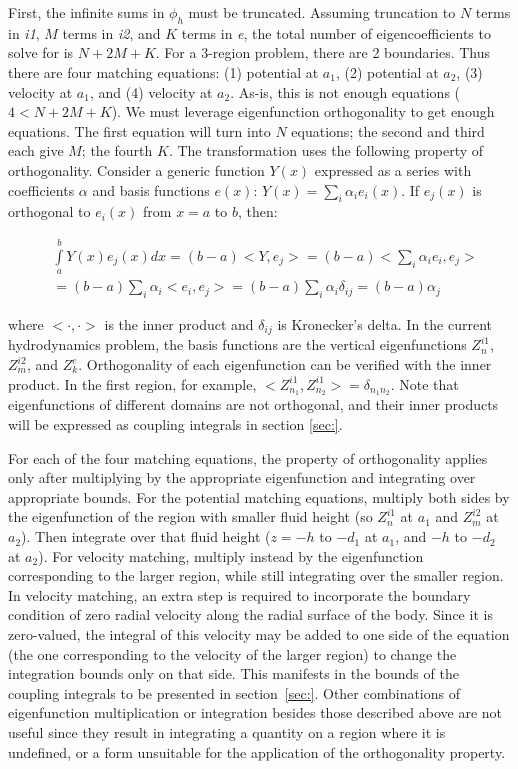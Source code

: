 \begin{appendices}
First, the infinite sums in $\phi_h$ must be truncated. Assuming truncation to $N$ terms in \textit{i1}, $M$ terms in \textit{i2}, and $K$ terms in \textit{e}, the total number of eigencoefficients to solve for is $N+2M+K$. For a 3-region problem, there are 2 boundaries. Thus there are four matching equations: (1) potential at $a_1$, (2) potential at $a_2$, (3) velocity at $a_1$, and (4) velocity at $a_2$. As-is, this is not enough equations ($4 < N+2M+K$). We must leverage eigenfunction orthogonality to get enough equations. The first equation will turn into $N$ equations; the second and third each give $M$; the fourth $K$. The transformation uses the following property of orthogonality. Consider a generic function $Y(x)$ expressed as a series with coefficients $\alpha$ and basis functions $e(x)$: $Y(x)=\sum_i \alpha_i e_i(x)$. If $e_j(x)$ is orthogonal to $e_i(x)$ from $x = a$ to $b$, then:

\begin{equation}
\begin{aligned}
       & \int\limits_a^b Y(x)e_j(x)dx = (b-a) <Y,e_j>=(b-a)<\sum_i \alpha_i e_i, e_j> \\ &= (b-a) \sum_i \alpha_i <e_i,e_j> = (b-a) \sum_i \alpha_i \delta_{ij} = (b-a) \alpha_j
\end{aligned}
\end{equation}

where $<\cdot,\cdot>$ is the inner product and $\delta_{ij}$ is Kronecker’s delta. In the current hydrodynamics problem, the basis functions are the vertical eigenfunctions $Z_n^{i1}$, $Z_m^{i2}$, and $Z_k^{e}$. Orthogonality of each eigenfunction can be verified with the inner product. In the first region, for example, $<Z_{n_1}^{i1},Z_{n_2}^{i1}>=\delta_{n_1n_2}$. Note that eigenfunctions of different domains are not orthogonal, and their inner products will be expressed as coupling integrals in section \ref{sec:}.

For each of the four matching equations, the property of orthogonality applies only after multiplying by the appropriate eigenfunction and integrating over appropriate bounds. For the potential matching equations, multiply both sides by the eigenfunction of the region with smaller fluid height (so $Z_n^{i1}$ at $a_1$ and $Z_m^{i2}$ at $a_2$). Then integrate over that fluid height ($z=-h$ to $-d_1$ at $a_1$, and $-h$ to $-d_2$ at $a_2$). For velocity matching, multiply instead by the eigenfunction corresponding to the larger region, while still integrating over the smaller region. In velocity matching, an extra step is required to incorporate the boundary condition of zero radial velocity along the radial surface of the body. Since it is zero-valued, the integral of this velocity may be added to one side of the equation (the one corresponding to the velocity of the larger region) to change the integration bounds only on that side. This manifests in the bounds of the coupling integrals to be presented in section~\ref{sec:}. Other combinations of eigenfunction multiplication or integration besides those described above are not useful since they result in integrating a quantity on a region where it is undefined, or a form unsuitable for the application of the orthogonality property.


\end{appendices}
